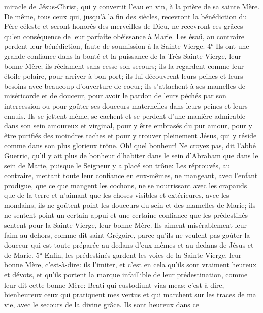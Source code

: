 miracle de Jésus-Christ, qui y convertit l'eau en vin, à la prière de sa sainte Mère. De même, tous ceux qui, jusqu'à
la fin des siècles, recevront la bénédiction du Père céleste et seront honorés des merveilles de Dieu, ne recevront
ces grâces qu'en conséquence de leur parfaite obéissance à Marie. Les ésaü, au contraire perdent leur
bénédiction, faute de soumission à la Sainte Vierge.
 4° Ils ont une grande confiance dans la bonté et la puissance de la Très Sainte Vierge, leur bonne Mère; ils
réclament sans cesse son secours; ils la regardent comme leur étoile polaire, pour arriver à bon port; ils lui
découvrent leurs peines et leurs besoins avec beaucoup d'ouverture de coeur; ils s'attachent à ses mamelles de
miséricorde et de douceur, pour avoir le pardon de leurs péchés par son intercession ou pour goûter ses douceurs
maternelles dans leurs peines et leurs ennuis. Ils se jettent même, se cachent et se perdent d'une manière
admirable dans son sein amoureux et virginal, pour y être embrasés du pur amour, pour y être purifiés des
moindres taches et pour y trouver pleinement Jésus, qui y réside comme dans son plus glorieux trône. Oh! quel
bonheur! Ne croyez pas, dit l'abbé Guerric, qu'il y ait plus de bonheur d'habiter dans le sein d'Abraham que dans le
sein de Marie, puisque le Seigneur y a placé son trône: 
Les réprouvés, au contraire, mettant toute leur confiance en eux-mêmes, ne mangeant, avec l'enfant prodigue, que
ce que mangent les cochons, ne se nourrissant avec les crapauds que de la terre et n'aimant que les choses
visibles et extérieures, avec les mondains, ils ne goûtent point les douceurs du sein et des mamelles de Marie; ils
ne sentent point un certain appui et une certaine confiance que les prédestinés sentent pour la Sainte Vierge, leur
bonne Mère. Ils aiment misérablement leur faim au dehors, comme dit saint Grégoire, parce qu'ils ne veulent pas
goûter la douceur qui est toute préparée au dedans d'eux-mêmes et au dedans de Jésus et de Marie.
 5° Enfin, les prédestinés gardent les voies de la Sainte Vierge, leur bonne Mère, c'est-à-dire: ils l'imiter, et
c'est en cela qu'ils sont vraiment heureux et dévots, et qu'ils portent la marque infaillible de leur prédestination,
comme leur dit cette bonne Mère: Beati qui custodiunt vias meas: c'est-à-dire, bienheureux ceux qui pratiquent
mes vertus et qui marchent sur les traces de ma vie, avec le secours de la divine grâce. Ils sont heureux dans ce
